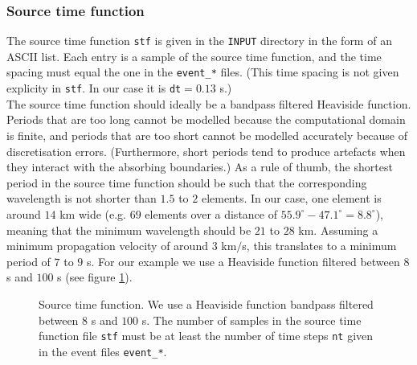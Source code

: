 \subsubsection{Source time function}

The source time function \texttt{stf} is given in the \texttt{INPUT} directory in the form of an ASCII list. Each entry is a sample of the source time function, and the time spacing must equal the one in the \texttt{event\_*} files. (This time spacing is not given explicity in \texttt{stf}. In our case it is \texttt{dt}$=0.13$ s.)\\[5pt]
The source time function should ideally be a bandpass filtered Heaviside function. Periods that are too long cannot be modelled because the computational domain is finite, and periods that are too short cannot be modelled accurately because of discretisation errors. (Furthermore, short periods tend to produce artefacts when they interact with the absorbing boundaries.) As a rule of thumb, the shortest period in the source time function should be such that the corresponding wavelength is not shorter than $1.5$ to $2$ elements. In our case, one element is around $14$ km wide (e.g. $69$ elements over a distance of $55.9^\circ-47.1^\circ=8.8^\circ$), meaning that the minimum wavelength should be $21$ to $28$ km. Assuming a minimum propagation velocity of around $3$ km$/$s, this translates to a minimum period of $7$ to $9$ s. For our example we use a Heaviside function filtered between $8$ s and $100$ s (see figure \ref{F:stf}).
\begin{center}
\begin{figure}
\center{} 
\caption{Source time function. We use a Heaviside function bandpass filtered between $8$ s and $100$ s. The number of samples in the source time function file \texttt{stf} must be at least the number of time steps \texttt{nt} given in the event files \texttt{event\_*}.}\label{F:stf}
\end{figure}
\end{center}


